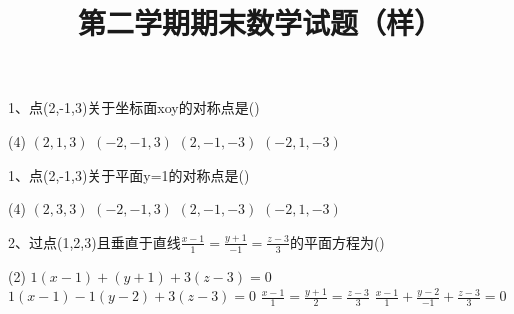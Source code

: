 \documentclass[11pt,a4paper]{article}
\title{第二学期期末数学试题（样）}
\date{}
\begin{document}
\maketitle



1、点(2,-1,3)关于坐标面xoy的对称点是\hfill(\qquad)
\begin{tasks}(4)
    \task $(2,1,3)$
    \task $(-2,-1,3)$
    \task $(2,-1,-3)$
    \task $(-2,1,-3)$
    \newline
\end{tasks}
1、点(2,-1,3)关于平面y=1的对称点是\hfill(\qquad)
\begin{tasks}(4)
    \task $(2,3,3)$
    \task $(-2,-1,3)$
    \task $(2,-1,-3)$
    \task $(-2,1,-3)$
    \newline
\end{tasks}
2、过点(1,2,3)且垂直于直线$\frac{x-1}{1}=\frac{y+1}{-1}=\frac{z-3}{3}$的平面方程为\hfill(\qquad)
\begin{tasks}(2)
    \task $1(x-1)+(y+1)+3(z-3)=0$
    \task $1(x-1)-1(y-2)+3(z-3)=0$
    \task $\frac{x-1}{1}=\frac{y+1}{2}=\frac{z-3}{3}$
    \task $\frac{x-1}{1}+\frac{y-2}{-1}+\frac{z-3}{3}=0$
    \newline
\end{tasks}
\end{document}
